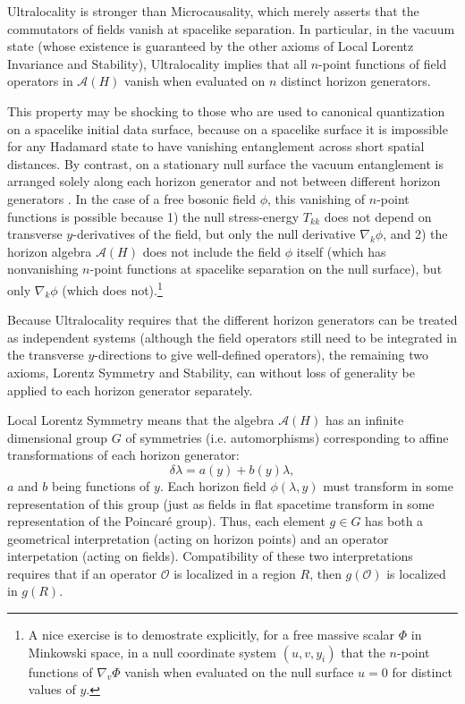 \documentclass{article}
\begin{document}
Ultralocality is stronger than Microcausality, which merely asserts that the commutators of fields vanish at spacelike separation.  In particular, in the vacuum state (whose existence is guaranteed by the other axioms of Local Lorentz Invariance and Stability), Ultralocality implies that all $n$-point functions of field operators in $\mathcal{A}(H)$ vanish when evaluated on $n$ distinct horizon generators.

This property may be shocking to those who are used to canonical quantization on a spacelike initial data surface, because on a spacelike surface it is impossible for any Hadamard state to have vanishing entanglement across short spatial distances.  By contrast, on a stationary null surface the vacuum entanglement is arranged solely along each horizon generator and not between different horizon generators \cite{schroer09}.  In the case of a free bosonic field $\phi$, this vanishing of $n$-point functions is possible because 1) the null stress-energy $T_{kk}$ does not depend on transverse $y$-derivatives of the field, but only the null derivative $\nabla_k \phi$, and 2) the horizon algebra $\mathcal{A}(H)$ does not include the field $\phi$ itself (which has nonvanishing $n$-point functions at spacelike separation on the null surface), but only $\nabla_k \phi$ (which does not).\footnote{A nice exercise is to demostrate explicitly, for a free massive scalar $\Phi$ in Minkowski space, in a null coordinate system $(u, v, y_i)$ that the $n$-point functions of $\nabla_v \Phi$ vanish when evaluated on the null surface $u = 0$ for distinct values of $y$.}

Because Ultralocality requires that the different horizon generators can be treated as independent systems (although the field operators still need to be integrated in the transverse $y$-directions to give well-defined operators), the remaining two axioms, Lorentz Symmetry and Stability, can without loss of generality be applied to each horizon generator separately.

Local Lorentz Symmetry means that the algebra $\mathcal{A}(H)$ has an infinite dimensional group $G$ of symmetries (i.e. automorphisms) corresponding to affine transformations of each horizon generator:
\begin{equation}
\delta \lambda = a(y) + b(y) \lambda,
\end{equation}
$a$ and $b$ being functions of $y$.  Each horizon field $\phi(\lambda, y)$ must transform in some representation of this group (just as fields in flat spacetime transform in some representation of the Poincar\'{e} group).  Thus, each element $g \in G$ has both a geometrical interpretation (acting on horizon points) and an operator interpetation (acting on fields).  Compatibility of these two interpretations requires that if an operator $\mathcal{O}$ is localized in a region $R$, then $g(\mathcal{O})$ is localized in $g(R)$.
\end{document}
